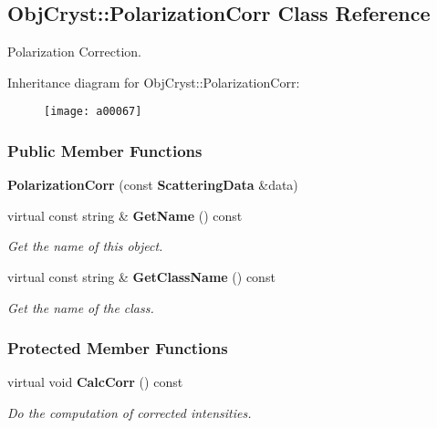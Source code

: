 \subsection{Obj\+Cryst\+:\+:Polarization\+Corr Class Reference}
\label{a00067}


Polarization Correction.  


Inheritance diagram for Obj\+Cryst\+:\+:Polarization\+Corr\+:\begin{figure}[H]
\begin{center}
\leavevmode
\texttt{[image: a00067]}
\end{center}
\end{figure}
\subsubsection*{Public Member Functions}
\begin{DoxyCompactItemize}
\item 
{\bfseries Polarization\+Corr} (const {\bf Scattering\+Data} \&data)\label{a00067_a2a4847d1595188d8023f20c9c9d0d4ce}

\item 
virtual const string \& {\bf Get\+Name} () const \label{a00067_a6bfca1f83186379f77e2ee2ef5e65ac5}

\begin{DoxyCompactList}\small\item\em Get the name of this object. \end{DoxyCompactList}\item 
virtual const string \& {\bf Get\+Class\+Name} () const \label{a00067_ae298bdf956280d610cc18aad4acb1af7}

\begin{DoxyCompactList}\small\item\em Get the name of the class. \end{DoxyCompactList}\end{DoxyCompactItemize}
\subsubsection*{Protected Member Functions}
\begin{DoxyCompactItemize}
\item 
virtual void {\bf Calc\+Corr} () const \label{a00067_a3030bd67935be0434c1cebfd385b82a2}

\begin{DoxyCompactList}\small\item\em Do the computation of corrected intensities. \end{DoxyCompactList}\end{DoxyCompactItemize}
